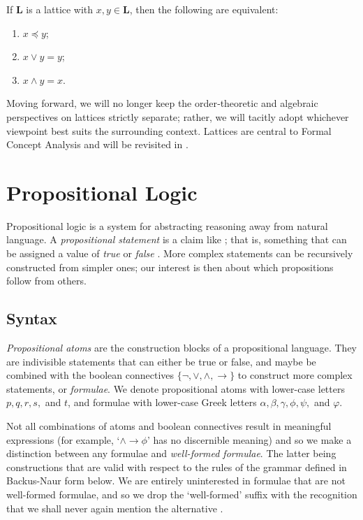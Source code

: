 \begin{lemma}
  \label{lemma:the-connecting-lemma}
  If $\mathbf{L}$ is a lattice with $x, y \in \mathbf{L}$, then the following are equivalent:
  \begin{enumerate}
      \setlength\itemsep{0pt}
      \setlength\parsep{0pt}
    \item $x \preceq y$;
    \item $x \vee y = y$;
    \item $x \wedge y = x$.
  \end{enumerate}
\end{lemma}

Moving forward, we will no longer keep the order‑theoretic and algebraic perspectives on lattices strictly separate; rather, we will tacitly adopt whichever viewpoint best suits the surrounding context. Lattices are central to Formal Concept Analysis and will be revisited in .

\section{Propositional Logic}
\label{section:propositional-logic}

Propositional logic is a system for abstracting reasoning away from natural language. A \textit{propositional statement} is a claim like ; that is, something that can be assigned a value of \textit{true} or \textit{false} \cite[p. 7]{Ben1993Mathematical}. More complex statements can be recursively constructed from simpler ones; our interest is then about which propositions follow from others. 

\subsection{Syntax}
\label{subsection:syntax}
\textit{Propositional atoms} are the construction blocks of a propositional language. They are indivisible statements that can either be true or false, and maybe be combined with the boolean connectives $\{\neg, \lor, \land, \rightarrow\}$ to construct more complex statements, or \textit{formulae}. We denote propositional atoms with lower-case letters $p,q,r,s,$ and $t$, and formulae with lower-case Greek letters $\alpha, \beta, \gamma, \phi, \psi,$ and $\varphi$. 

Not all combinations of atoms and boolean connectives result in meaningful expressions (for example, `$\land \rightarrow \phi$' has no discernible meaning) and so we make a distinction between any formulae and \textit{well-formed formulae}. The latter being constructions that are valid with respect to the rules of the grammar defined in Backus-Naur form below. We are entirely uninterested in formulae that are not well-formed formulae, and so we drop the `well-formed' suffix with the recognition that we shall never again mention the alternative \cite[p. 33]{Huth_Ryan_2004}.

